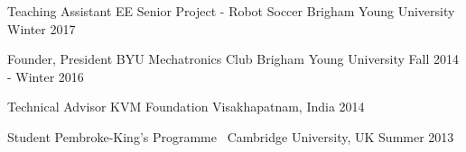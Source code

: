 

\begin{cvhonors}

  \cvhonor
    {Teaching Assistant} %
    {EE Senior Project - Robot Soccer} %
    {Brigham Young University} %
    {Winter 2017} %

  \cvhonor
    {Founder, President} %
    {BYU Mechatronics Club} %
    {Brigham Young University} %
    {Fall 2014 - Winter 2016} %

  \cvhonor
	{Technical Advisor} %
	{KVM Foundation} %
	{\quad\enspace Visakhapatnam, India} %
	{2014} %
	
  \cvhonor
	{Student} %
	{Pembroke-King's Programme} %
	{\ Cambridge University, UK} %
	{Summer 2013} %

\end{cvhonors}
